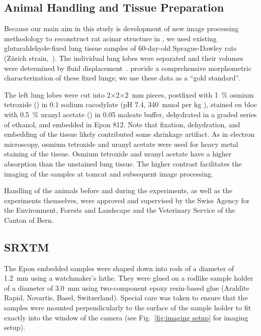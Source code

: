 \subsection[Animal Handling]{Animal Handling and Tissue Preparation}
Because our main aim in this study is development of new image processing methodology to reconstruct rat acinar structure in \threed, we used existing glutaraldehyde-fixed lung tissue samples of 60-day-old Sprague-Dawley rats (Zürich strain,~\cite{Tschanz2003}). The individual lung lobes were separated and their volumes were determined by fluid displacement~\cite{Scherle1970}. \citet{Tschanz2003} provide a comprehensive morphometric characterization of these fixed lungs; we use these data as a ``gold standard''.

The left lung lobes were cut into 2$\times$2$\times$\SI{2}{\milli\meter} pieces, postfixed with \SI{1}{\percent} osmium tetroxide () in \SI{0.1}{\Molar} sodium cacodylate (pH 7.4, \SI{340}{\mmol} per \si{\kilogram} ), stained en bloc with \SI{0.5}{\percent} uranyl acetate () in \SI{0.05}{\Molar} maleate buffer, dehydrated in a graded series of ethanol, and embedded in Epon 812. Note that fixation, dehydration, and embedding of the tissue likely contributed some shrinkage artifact. As in electron microscopy, osmium tetroxide and uranyl acetate were used for heavy metal staining of the tissue. Osmium tetroxide and uranyl acetate have a higher absorption than the unstained lung tissue. The higher contrast facilitates the imaging of the samples at \ac{tomcat} and subsequent image processing.

Handling of the animals before and during the experiments, as well as the experiments themselves, were approved and supervised by the Swiss Agency for the Environment, Forests and Landscape and the Veterinary Service of the Canton of Bern.

\subsection{SRXTM}
The Epon embedded samples were shaped down into rods of a diameter of \SI{1.2}{\milli\meter} using a watchmaker's lathe. They were glued on a rodlike sample holder of a diameter of \SI{3.0}{\milli\meter} using two-component epoxy resin-based glue (Araldite Rapid, Novartis, Basel, Switzerland). Special care was taken to ensure that the samples were mounted perpendicularly to the surface of the sample holder to fit exactly into the window of the camera (see Fig.~\ref{fig:imaging setup} for imaging setup).

